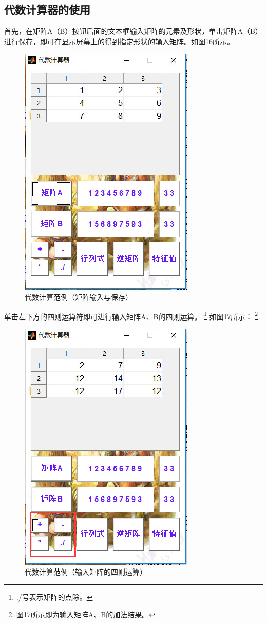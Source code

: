 \documentclass[UTF8]{ctexart}
\begin{document}
\subsection{代数计算器的使用}
首先，在矩阵A（B）按钮后面的文本框输入矩阵的元素及形状，单击矩阵A（B）进行保存，即可在显示屏幕上的得到指定形状的输入矩阵。如图16所示。
\begin{figure}[H]
\centering
\includegraphics[scale=0.4]{image/pic10.png}
\caption{代数计算范例（矩阵输入与保存）}
\label{fig:pic10}
\end{figure}
单击左下方的四则运算符即可进行输入矩阵A、B的四则运算。
\footnote{./号表示矩阵的点除。}
如图17所示：
\footnote{图17所示即为输入矩阵A、B的加法结果。}
\begin{figure}[H]
\centering
\includegraphics[scale=0.4]{image/pic11.png}
\caption{代数计算范例（输入矩阵的四则运算）}
\label{fig:pic11}
\end{figure}
\end{document}
